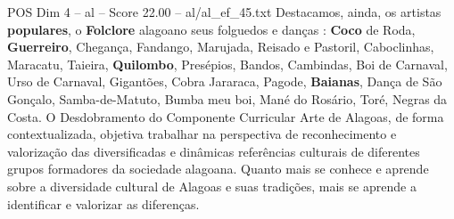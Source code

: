\begin{textsample}{POS Dim 4 – al – Score 22.00 – al/al\_ef\_45.txt}
Destacamos, ainda, os artistas \textbf{populares}, o \textbf{Folclore} alagoano seus folguedos e danças : \textbf{Coco} de Roda, \textbf{Guerreiro}, Chegança, Fandango, Marujada, Reisado e Pastoril, Caboclinhas, Maracatu, Taieira, \textbf{Quilombo}, Presépios, Bandos, Cambindas, Boi de Carnaval, Urso de Carnaval, Gigantões, Cobra Jararaca, Pagode, \textbf{Baianas}, Dança de São Gonçalo, Samba-de-Matuto, Bumba meu boi, Mané do Rosário, Toré, Negras da Costa.
O Desdobramento do Componente Curricular Arte de Alagoas, de forma contextualizada, objetiva trabalhar na perspectiva de reconhecimento e valorização das diversificadas e dinâmicas referências culturais de diferentes grupos formadores da sociedade alagoana.
Quanto mais se conhece e aprende sobre a diversidade cultural de Alagoas e suas tradições, mais se aprende a identificar e valorizar as diferenças.

\end{textsample}
